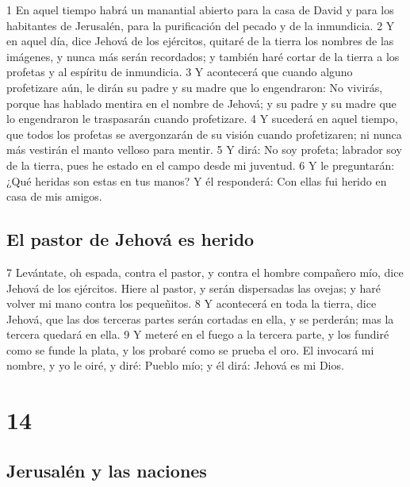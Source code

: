 1 En aquel tiempo habrá un manantial abierto para la casa de David y para los habitantes de Jerusalén, para la purificación del pecado y de la inmundicia.
2 Y en aquel día, dice Jehová de los ejércitos, quitaré de la tierra los nombres de las imágenes, y nunca más serán recordados; y también haré cortar de la tierra a los profetas y al espíritu de inmundicia.
3 Y acontecerá que cuando alguno profetizare aún, le dirán su padre y su madre que lo engendraron: No vivirás, porque has hablado mentira en el nombre de Jehová; y su padre y su madre que lo engendraron le traspasarán cuando profetizare.
4 Y sucederá en aquel tiempo, que todos los profetas se avergonzarán de su visión cuando profetizaren; ni nunca más vestirán el manto velloso para mentir.
5 Y dirá: No soy profeta; labrador soy de la tierra, pues he estado en el campo desde mi juventud.
6 Y le preguntarán: ¿Qué heridas son estas en tus manos? Y él responderá: Con ellas fui herido en casa de mis amigos.

\section*{El pastor de Jehová es herido}

7 Levántate, oh espada, contra el pastor, y contra el hombre compañero mío, dice Jehová de los ejércitos. Hiere al pastor, y serán dispersadas las ovejas; y haré volver mi mano contra los pequeñitos.
8 Y acontecerá en toda la tierra, dice Jehová, que las dos terceras partes serán cortadas en ella, y se perderán; mas la tercera quedará en ella.
9 Y meteré en el fuego a la tercera parte, y los fundiré como se funde la plata, y los probaré como se prueba el oro. El invocará mi nombre, y yo le oiré, y diré: Pueblo mío; y él dirá: Jehová es mi Dios.

\chapter{14}

\section*{Jerusalén y las naciones}

